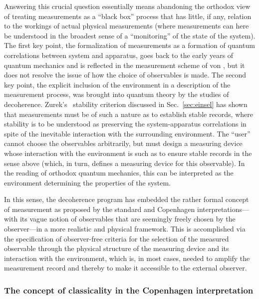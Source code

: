 \documentclass[twocolumn,rmp,aps,amsmath,amsfonts,noshowkeys,noshowpacs]{revtex4}
\begin{document}
Answering this crucial question essentially means abandoning the
orthodox view of treating measurements as a ``black box'' process that
has little, if any, relation to the workings of actual physical
measurements (where measurements can here be understood in the
broadest sense of a ``monitoring'' of the state of the system).  The
first key point, the formalization of measurements as a formation of
quantum correlations between system and apparatus, goes back to the
early years of quantum mechanics and is reflected in the measurement
scheme of von \citet{Neumann:1932:gq}, but it does not resolve the
issue of how the choice of observables is made. The second key point,
the explicit inclusion of the environment in a description of the
measurement process, was brought into quantum theory by the studies of
decoherence. Zurek's~\citeyearpar{Zurek:1981:dd} stability criterion
discussed in Sec.~\ref{sec:einsel} has shown that measurements must be
of such a nature as to establish stable records, where stability is to
be understood as preserving the system-apparatus correlations in spite
of the inevitable interaction with the surrounding environment.  The
``user'' cannot choose the observables arbitrarily, but must design a
measuring device whose interaction with the environment is such as to
ensure stable records in the sense above (which, in turn, defines a
measuring device for this observable). In the reading of orthodox
quantum mechanics, this can be interpreted as the environment
determining the properties of the system.

In this sense, the decoherence program has embedded the rather formal
concept of measurement as proposed by the standard and Copenhagen
interpretations---with its vague notion of observables that are
seemingly freely chosen by the observer---in a more realistic and
physical framework. This is accomplished via the specification of
observer-free criteria for the selection of the measured observable
through the physical structure of the measuring device and its
interaction with the environment, which is, in most cases, needed to
amplify the measurement record and thereby to make it accessible to
the external observer.


\subsubsection{The concept of classicality in the Copenhagen interpretation}
\end{document}
